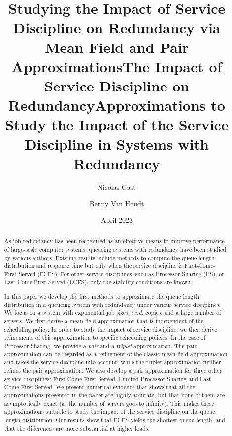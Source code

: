 \documentclass[acmsmall,nonacm]{acmart}
\title{Studying the Impact of Service Discipline on Redundancy via Mean Field and Pair Approximations}
\title{The Impact of Service Discipline on Redundancy}
\title{Approximations to Study the Impact of the Service Discipline in Systems with Redundancy}
\author{Nicolas Gast}
\affiliation{
  \institution{Univ. Grenoble Alpes, Inria}
  \city{Grenoble}
  \country{France}
}
\author{Benny Van Houdt}
\affiliation{
    \institution{Dept. Computer Science, University of Antwerp}
    \city{Antwerp}
    \country{Belgium}
}
\date{April 2023}
\begin{document}
\begin{abstract}
As job redundancy has been recognized as an effective means to improve performance of large-scale computer systems, queueing systems with redundancy have been studied by various authors. Existing results include methods to compute the queue length distribution and response time but only when the service discipline is First-Come-First-Served (FCFS). For other service disciplines, such as Processor Sharing (PS), or Last-Come-First-Served (LCFS), only the stability conditions are known. 

In this paper we develop the first methods to approximate the queue length distribution in a queueing system with redundancy under various service disciplines. We focus on a system with exponential job sizes, \emph{i.i.d.} copies, and a large number of servers. We first derive a mean field approximation that is independent of the scheduling policy. In order to study the impact of service discipline, we then derive refinements of this approximation to specific scheduling policies. In the case of Processor Sharing, we provide a {\it pair} and a {\it triplet} approximation.   The pair approximation can be regarded as a refinement of the classic mean field approximation and takes the service discipline into account, while the triplet approximation further refines the pair approximation.  We also develop a pair approximation for three other service disciplines: First-Come-First-Served, Limited Processor Sharing and Last-Come-First-Served. We present numerical evidence that shows that all the approximations presented in the paper are highly accurate, but that none of them are asymptotically exact (as the number of servers goes to infinity). This makes these approximations suitable to study the impact of the service discipline on the queue length distribution. Our results show that FCFS yields the shortest queue length, and that the differences are more substantial at higher loads.
\end{abstract}

\maketitle
\end{document}
